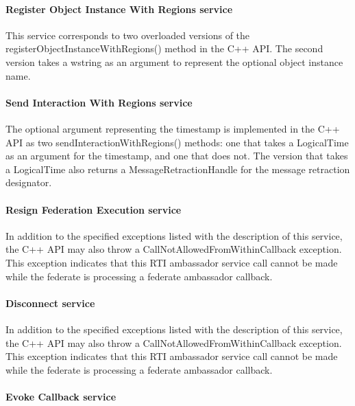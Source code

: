 \begin{compactstdpage}
    \paragraph{Register Object Instance With Regions service}

    This service corresponds to two overloaded versions of the registerObjectInstanceWithRegions() method in the C++ API. The second version takes a wstring as an argument to represent the optional object instance name.

    \paragraph{Send Interaction With Regions service}

    The optional argument representing the timestamp is implemented in the C++ API as two sendInteractionWithRegions() methods: one that takes a LogicalTime as an argument for the timestamp, and one that does not. The version that takes a LogicalTime also returns a MessageRetractionHandle for the message retraction designator.

    \paragraph{Resign Federation Execution service}

    In addition to the specified exceptions listed with the description of this service, the C++ API may also throw a CallNotAllowedFromWithinCallback exception. This exception indicates that this RTI ambassador service call cannot be made while the federate is processing a federate ambassador callback.

    \paragraph{Disconnect service}

    In addition to the specified exceptions listed with the description of this service, the C++ API may also throw a CallNotAllowedFromWithinCallback exception. This exception indicates that this RTI ambassador service call cannot be made while the federate is processing a federate ambassador callback.

    \paragraph{Evoke Callback service}


\end{compactstdpage}
